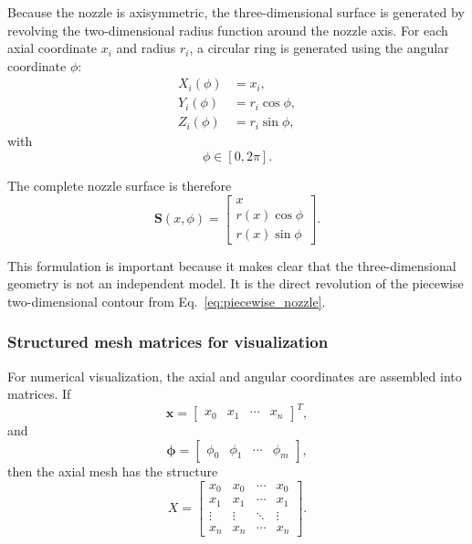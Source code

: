 \documentclass[11pt,a4paper]{article}
\begin{document}
Because the nozzle is axisymmetric, the three-dimensional surface is generated by revolving the two-dimensional radius function around the nozzle axis. For each axial coordinate $x_i$ and radius $r_i$, a circular ring is generated using the angular coordinate $\phi$:
\begin{align}
X_i(\phi)&=x_i,\\
Y_i(\phi)&=r_i\cos\phi,\\
Z_i(\phi)&=r_i\sin\phi,
\end{align}
with
\begin{equation}
\phi\in[0,2\pi].
\end{equation}

The complete nozzle surface is therefore
\begin{equation}
\bm{S}(x,\phi)=
\begin{bmatrix}
x\\
r(x)\cos\phi\\
r(x)\sin\phi
\end{bmatrix}.
\label{eq:surface_of_revolution}
\end{equation}

This formulation is important because it makes clear that the three-dimensional geometry is not an independent model. It is the direct revolution of the piecewise two-dimensional contour from Eq.~\eqref{eq:piecewise_nozzle}.

\subsubsection{Structured mesh matrices for visualization}

For numerical visualization, the axial and angular coordinates are assembled into matrices. If
\begin{equation}
\bm{x}=\begin{bmatrix}x_0&x_1&\cdots&x_n\end{bmatrix}^T,
\end{equation}
and
\begin{equation}
\bm{\phi}=\begin{bmatrix}\phi_0&\phi_1&\cdots&\phi_m\end{bmatrix},
\end{equation}
then the axial mesh has the structure
\begin{equation}
X=\begin{bmatrix}
x_0&x_0&\cdots&x_0\\
x_1&x_1&\cdots&x_1\\
\vdots&\vdots&\ddots&\vdots\\
x_n&x_n&\cdots&x_n
\end{bmatrix}.
\label{eq:Xmesh}
\end{equation}
\end{document}
